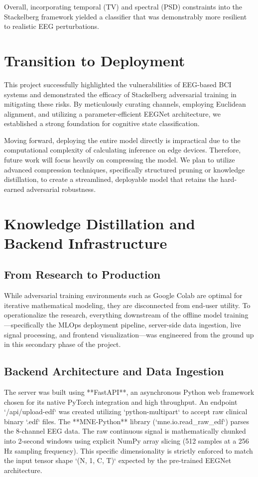 \documentclass[10pt,a4paper,openright]{report}
\begin{document}
Overall, incorporating temporal (TV) and spectral (PSD) constraints into the Stackelberg framework yielded a classifier that was demonstrably more resilient to realistic EEG perturbations.

\chapter{Transition to Deployment}
This project successfully highlighted the vulnerabilities of EEG-based BCI systems and demonstrated the efficacy of Stackelberg adversarial training in mitigating these risks. By meticulously curating channels, employing Euclidean alignment, and utilizing a parameter-efficient EEGNet architecture, we established a strong foundation for cognitive state classification.

Moving forward, deploying the entire model directly is impractical due to the computational complexity of calculating inference on edge devices. Therefore, future work will focus heavily on compressing the model. We plan to utilize advanced compression techniques, specifically structured pruning or knowledge distillation, to create a streamlined, deployable model that retains the hard-earned adversarial robustness.

\chapter{Knowledge Distillation and Backend Infrastructure}

\section{From Research to Production}
While adversarial training environments such as Google Colab are optimal for iterative mathematical modeling, they are disconnected from end-user utility. To operationalize the research, everything downstream of the offline model training—specifically the MLOps deployment pipeline, server-side data ingestion, live signal processing, and frontend visualization—was engineered from the ground up in this secondary phase of the project.

\section{Backend Architecture and Data Ingestion}
The server was built using **FastAPI**, an asynchronous Python web framework chosen for its native PyTorch integration and high throughput. An endpoint `/api/upload-edf` was created utilizing `python-multipart` to accept raw clinical binary `.edf` files. The **MNE-Python** library (`mne.io.read_raw_edf`) parses the 8-channel EEG data. The raw continuous signal is mathematically chunked into 2-second windows using explicit NumPy array slicing (512 samples at a 256 Hz sampling frequency). This specific dimensionality is strictly enforced to match the input tensor shape `(N, 1, C, T)` expected by the pre-trained EEGNet architecture.
\end{document}
